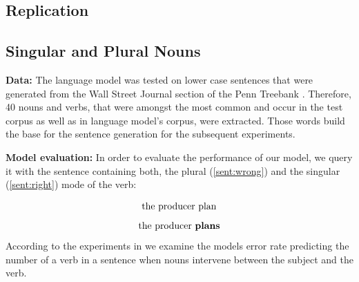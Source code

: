 \documentclass[twoside]{article}
\begin{document}
\begin{multicols}{2} %












\section{Replication}
\label{replication}

\subsection{Singular and Plural Nouns}

\textbf{Data:} 
The language model was tested on lower case sentences that were generated from the Wall Street Journal section of the Penn Treebank \citep{Marcus1993}. Therefore, 40 nouns and verbs, that were amongst the most common and occur in the test corpus as well as in language model's corpus, were extracted. Those words build the base for the sentence generation for the subsequent experiments. 

\textbf{Model evaluation:} In order to evaluate the performance of our model, we query it with the sentence containing both, the plural (\ref{sent:wrong}) and the singular (\ref{sent:right}) mode of the verb: 

\begin{equation}
	\label{sent:wrong}
	\textnormal{the producer plan}
\end{equation}
\begin{equation}
	\label{sent:right}
	\textnormal{the producer  \textbf{plans}}
\end{equation}
According to the experiments in \citep{Linzen2016} we examine the models error rate predicting the number of a verb in a sentence when nouns intervene between the subject and the verb. 


\end{multicols}
\end{document}
